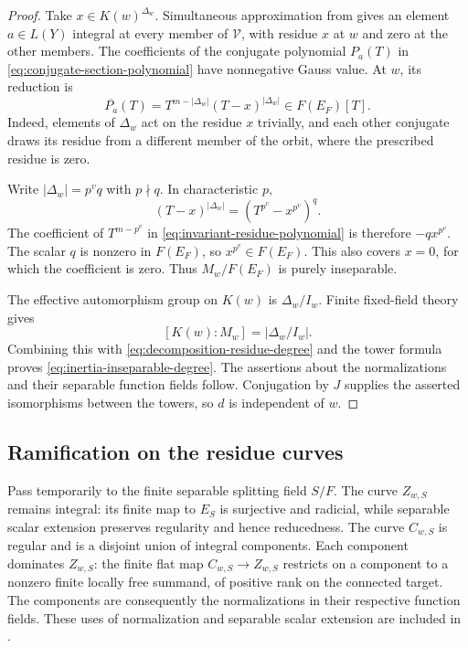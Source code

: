\begin{proof}
Take $x\in K(w)^{\Delta_w}$. Simultaneous approximation from
 gives an element $a\in L(Y)$ integral
at every member of $\mathcal V$, with residue $x$ at $w$ and zero at
the other members. The coefficients of the conjugate polynomial
$P_a(T)$ in \eqref{eq:conjugate-section-polynomial} have nonnegative
Gauss value. At $w$, its reduction is
\begin{equation}\label{eq:invariant-residue-polynomial}
 \overline{P_a}(T)
 =T^{m-|\Delta_w|}(T-x)^{|\Delta_w|}
 \in F(E_F)[T].
\end{equation}
Indeed, elements of $\Delta_w$ act on the residue $x$ trivially, and
each other conjugate draws its residue from a different member of
the orbit, where the prescribed residue is zero.

Write $|\Delta_w|=p^v q$ with $p\nmid q$. In characteristic $p$,
\[
 (T-x)^{|\Delta_w|}=(T^{p^v}-x^{p^v})^q.
\]
The coefficient of $T^{m-p^v}$ in
\eqref{eq:invariant-residue-polynomial} is therefore
$-q x^{p^v}$. The scalar $q$ is nonzero in $F(E_F)$, so
$x^{p^v}\in F(E_F)$. This also covers $x=0$, for which the coefficient
is zero. Thus $M_w/F(E_F)$ is purely inseparable.

The effective automorphism group on $K(w)$ is $\Delta_w/I_w$.
Finite fixed-field theory gives
\[
 [K(w):M_w]=|\Delta_w/I_w|.
\]
Combining this with \eqref{eq:decomposition-residue-degree} and the
tower formula proves \eqref{eq:inertia-inseparable-degree}.
The assertions about the normalizations and their separable function
fields follow. Conjugation by $J$ supplies the asserted isomorphisms
between the towers, so $d$ is independent of $w$.
\end{proof}

\subsection{Ramification on the residue curves}

Pass temporarily to the finite separable splitting field $S/F$.
The curve $Z_{w,S}$ remains integral: its finite map to $E_S$ is
surjective and radicial, while separable scalar extension preserves
regularity and hence reducedness. The curve $C_{w,S}$ is regular and
is a disjoint union of integral components. Each component dominates
$Z_{w,S}$: the finite flat map $C_{w,S}\to Z_{w,S}$ restricts on a
component to a nonzero finite locally free summand, of positive rank
on the connected target. The components are consequently the
normalizations in their respective function fields. These uses of
normalization and separable scalar extension are included in
.

